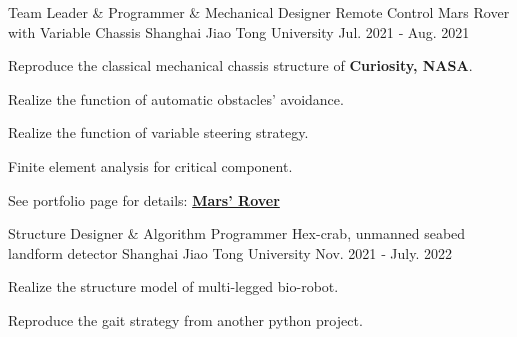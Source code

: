 \begin{cventries}

  \cventry
    {Team Leader \& Programmer \& Mechanical Designer} %
    {Remote Control Mars Rover with Variable Chassis} %
    {Shanghai Jiao Tong University} %
    {Jul. 2021 ‑ Aug. 2021} %
    {
      \begin{cvitems} %
        \item {Reproduce the classical mechanical chassis structure of \textbf{Curiosity, NASA}.}
        \item {Realize the function of automatic obstacles' avoidance.}
        \item {Realize the function of variable steering strategy.}
        \item {Finite element analysis for critical component.}
        \item {See portfolio page for details: \href{https://priest-yang.github.io/shaoze}{\textbf{Mars' Rover}} }
      \end{cvitems}
    }


\cventry
{Structure Designer \& Algorithm Programmer} %
{Hex-crab, unmanned seabed landform detector} %
{Shanghai Jiao Tong University} %
{Nov. 2021 ‑ July. 2022}%
{
  \begin{cvitems} %
    \item {Realize the structure model of multi-legged bio-robot.}
    \item {Reproduce the gait strategy from another python project.}
  \end{cvitems}
}


\end{cventries}
